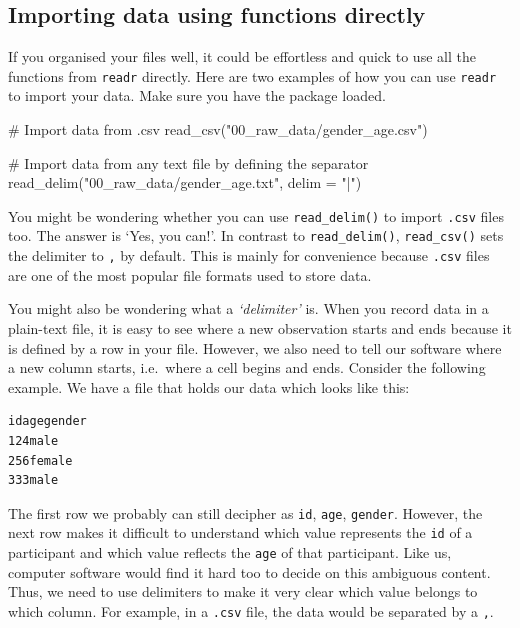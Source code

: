 \documentclass[
  letterpaper,
]{krantz}
\makeatletter
\newenvironment{Shaded}{\begin{snugshade}}{\end{snugshade}}
\newcommand{\AttributeTok}[1]{\textcolor[rgb]{0.40,0.45,0.13}{#1}}
\newcommand{\CommentTok}[1]{\textcolor[rgb]{0.37,0.37,0.37}{#1}}
\newcommand{\FunctionTok}[1]{\textcolor[rgb]{0.28,0.35,0.67}{#1}}
\newcommand{\NormalTok}[1]{\textcolor[rgb]{0.00,0.23,0.31}{#1}}
\newcommand{\StringTok}[1]{\textcolor[rgb]{0.13,0.47,0.30}{#1}}
\newenvironment{kframe}{%
\medskip{}
\setlength{\fboxsep}{.8em}
 \def\at@end@of@kframe{}%
 \ifinner\ifhmode%
  \def\at@end@of@kframe{\end{minipage}}%
  \begin{minipage}{\columnwidth}%
 \fi\fi%
 \def\FrameCommand##1{\hskip\@totalleftmargin \hskip-\fboxsep
 \colorbox{shadecolor}{##1}\hskip-\fboxsep
     \hskip-\linewidth \hskip-\@totalleftmargin \hskip\columnwidth}%
 \MakeFramed {\advance\hsize-\width
   \@totalleftmargin\z@ \linewidth\hsize
   \@setminipage}}%
 {\par\unskip\endMakeFramed%
 \at@end@of@kframe}
\renewenvironment{Shaded}{\begin{kframe}}{\end{kframe}}
\makeatother
\begin{document}
\subsection{Importing data using functions
directly}\label{sec-importing-data-using-functions}

If you organised your files well, it could be effortless and quick to
use all the functions from \texttt{readr} directly. Here are two
examples of how you can use \texttt{readr} to import your data. Make
sure you have the package loaded.

\begin{Shaded}
\begin{Highlighting}[]
\CommentTok{\# Import data from \textquotesingle{}.csv\textquotesingle{}}
\FunctionTok{read\_csv}\NormalTok{(}\StringTok{"00\_raw\_data/gender\_age.csv"}\NormalTok{)}

\CommentTok{\# Import data from any text file by defining the separator}
\FunctionTok{read\_delim}\NormalTok{(}\StringTok{"00\_raw\_data/gender\_age.txt"}\NormalTok{, }\AttributeTok{delim =} \StringTok{"|"}\NormalTok{)}
\end{Highlighting}
\end{Shaded}

You might be wondering whether you can use \texttt{read\_delim()} to
import \texttt{.csv} files too. The answer is `Yes, you can!'. In
contrast to \texttt{read\_delim()}, \texttt{read\_csv()} sets the
delimiter to \texttt{,} by default. This is mainly for convenience
because \texttt{.csv} files are one of the most popular file formats
used to store data.

You might also be wondering what a \emph{`delimiter'} is. When you
record data in a plain-text file, it is easy to see where a new
observation starts and ends because it is defined by a row in your file.
However, we also need to tell our software where a new column starts,
i.e.~where a cell begins and ends. Consider the following example. We
have a file that holds our data which looks like this:

\begin{verbatim}
idagegender
124male
256female
333male
\end{verbatim}

The first row we probably can still decipher as \texttt{id},
\texttt{age}, \texttt{gender}. However, the next row makes it difficult
to understand which value represents the \texttt{id} of a participant
and which value reflects the \texttt{age} of that participant. Like us,
computer software would find it hard too to decide on this ambiguous
content. Thus, we need to use delimiters to make it very clear which
value belongs to which column. For example, in a \texttt{.csv} file, the
data would be separated by a \texttt{,}.
\end{document}
